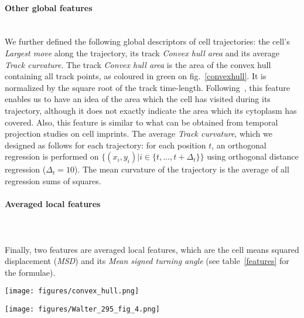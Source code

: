 
\paragraph{Other global features}~\\
We further defined the following global descriptors of cell
trajectories: the cell's \textit{Largest move} along the trajectory, its track
\textit{Convex hull area} and its average \textit{Track
  curvature}. The track \textit{Convex hull area} is the area of the
convex hull containing all track points, as coloured in green on
fig.~\ref{convexhull}. It is normalized by the square root of the
track time-length. Following~\cite{pmid18213366}, this feature enables
us to have an idea of the area which the cell has visited during its
trajectory, although it does not exactly indicate the area which its
cytoplasm has covered. Also, this feature is similar to what can be
obtained from temporal projection studies on cell imprints. The average \textit{Track curvature}, which we designed as follows for each trajectory: for each position $t$, an
orthogonal regression is performed on $\{(x_i, y_i) | i \in \{t,\ldots, t+\Delta_t\} \}$ using orthogonal distance regression ($\Delta_t=10$). The mean curvature of the trajectory is the average of all regression sums of squares. 
\paragraph{Averaged local features}~\\\\
Finally, two features are averaged local features, which are the cell
means squared displacement
(\textit{MSD}) and its \textit{Mean signed turning angle} (see table~\ref{features} for the formulae). 
\begin{figure*}[!ht]%
\centerline{\texttt{[image: figures/convex\_hull.png]}}
\caption{Convex hull of the example track from figure~\ref{fig:01}}
\label{convexhull}
\end{figure*}
\begin{figure*}[!tpb]%
\centerline{\texttt{[image: figures/Walter\_295\_fig\_4.png]}}
\caption{Heatmap showing trajectory feature similarities on a subset of the Mitocheck dataset (1.1 million trajectories coming from detected motility hit experiments according to MotIW). The dengrograms were obtained using the \textit{Ward} method and the euclidean distance between feature correlations.}\label{correlations}
\end{figure*}
